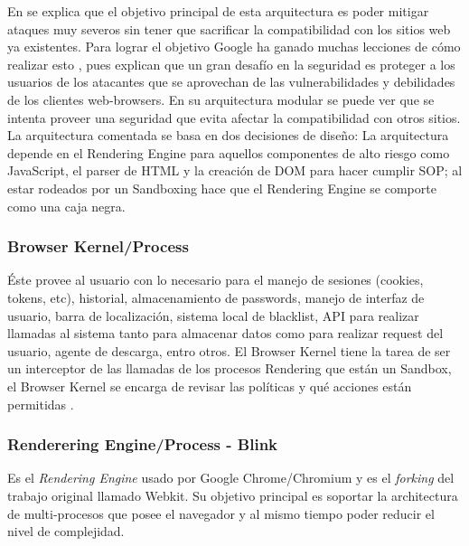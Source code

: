     En \cite{barth2008security} se explica que el objetivo principal de esta arquitectura es poder mitigar ataques muy severos sin tener que sacrificar la compatibilidad con los sitios web ya existentes. Para lograr el objetivo Google ha ganado muchas lecciones de cómo realizar esto \cite{reis2009browser}, pues explican que un gran desafío en la seguridad es proteger a los usuarios de los atacantes que se aprovechan de las vulnerabilidades y debilidades de los clientes web-browsers. En su arquitectura modular se puede ver que se intenta proveer una seguridad que evita afectar la compatibilidad con otros sitios. La arquitectura comentada se basa en dos decisiones de diseño: La arquitectura depende en el Rendering Engine para aquellos componentes de alto riesgo como JavaScript, el parser de HTML y la creación de DOM para hacer cumplir SOP; al estar rodeados por un Sandboxing hace que el Rendering Engine se comporte como una caja negra. 

    \subsubsection{Browser Kernel/Process}
    Éste provee al usuario con lo necesario para el manejo de sesiones (cookies, tokens, etc), historial, almacenamiento de passwords, manejo de interfaz de usuario, barra de localización, sistema local de blacklist, API para realizar llamadas al sistema tanto para almacenar datos como para realizar request del usuario, agente de descarga, entro otros. El Browser Kernel tiene la tarea de ser un interceptor de las llamadas de los procesos Rendering que están un Sandbox, el Browser Kernel se encarga de revisar las políticas y qué acciones están permitidas \cite{}.

    \subsubsection{Renderering Engine/Process - Blink}
     \label{chap2:Blink}
     Es el \textit{Rendering Engine} usado por Google Chrome/Chromium y es el \textit{forking} del trabajo original llamado Webkit. Su objetivo principal es soportar la architectura de multi-procesos que posee el navegador y al mismo tiempo poder reducir el nivel de complejidad.




